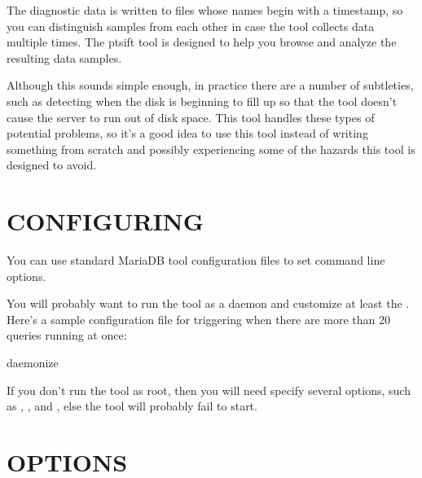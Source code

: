 \documentclass[letterpaper,10pt,english]{sphinxmanual}
\begin{document}
The diagnostic data is written to files whose names begin with a timestamp, so
you can distinguish samples from each other in case the tool collects data
multiple times.  The pt\sphinxhyphen{}sift tool is designed to help you browse and analyze
the resulting data samples.

Although this sounds simple enough, in practice there are a number of
subtleties, such as detecting when the disk is beginning to fill up so that the
tool doesn’t cause the server to run out of disk space.  This tool handles these
types of potential problems, so it’s a good idea to use this tool instead of
writing something from scratch and possibly experiencing some of the hazards
this tool is designed to avoid.


\section{CONFIGURING}
\label{\detokenize{mariadb-stat:configuring}}
You can use standard MariaDB tool configuration files to set command line
options.

You will probably want to run the tool as a daemon and customize at least the
{\hyperref[\detokenize{mariadb-stat:cmdoption-mariadb-stat-threshold}]{}}.  Here’s a sample configuration file for triggering when
there are more than 20 queries running at once:

\begin{sphinxVerbatim}[commandchars=\\\{\}]
daemonize
\end{sphinxVerbatim}

If you don’t run the tool as root, then you will need specify several options,
such as {\hyperref[\detokenize{mariadb-stat:cmdoption-mariadb-stat-pid}]{}}, {\hyperref[\detokenize{mariadb-stat:cmdoption-mariadb-stat-log}]{}}, and {\hyperref[\detokenize{mariadb-stat:cmdoption-mariadb-stat-dest}]{}}, else the tool will probably
fail to start.


\section{OPTIONS}
\label{\detokenize{mariadb-stat:options}}
\end{document}
